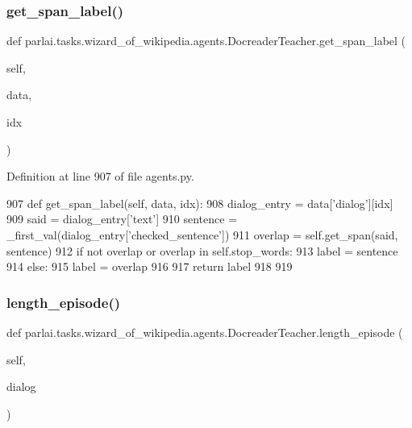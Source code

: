 \subsubsection{\texorpdfstring{get\+\_\+span\+\_\+label()}{get\_span\_label()}}
{\footnotesize\ttfamily def parlai.\+tasks.\+wizard\+\_\+of\+\_\+wikipedia.\+agents.\+Docreader\+Teacher.\+get\+\_\+span\+\_\+label (\begin{DoxyParamCaption}\item[{}]{self,  }\item[{}]{data,  }\item[{}]{idx }\end{DoxyParamCaption})}



Definition at line 907 of file agents.\+py.


\begin{DoxyCode}
907     \textcolor{keyword}{def }get\_span\_label(self, data, idx):
908         dialog\_entry = data[\textcolor{stringliteral}{'dialog'}][idx]
909         said = dialog\_entry[\textcolor{stringliteral}{'text'}]
910         sentence = \_first\_val(dialog\_entry[\textcolor{stringliteral}{'checked\_sentence'}])
911         overlap = self.get\_span(said, sentence)
912         \textcolor{keywordflow}{if} \textcolor{keywordflow}{not} overlap \textcolor{keywordflow}{or} overlap \textcolor{keywordflow}{in} self.stop\_words:
913             label = sentence
914         \textcolor{keywordflow}{else}:
915             label = overlap
916 
917         \textcolor{keywordflow}{return} label
918 
919 
\end{DoxyCode}
\mbox{\label{classparlai_1_1tasks_1_1wizard__of__wikipedia_1_1agents_1_1DocreaderTeacher_a1cb75f751dfa0b36d0f5c641c82be6c5}} 
\subsubsection{\texorpdfstring{length\+\_\+episode()}{length\_episode()}}
{\footnotesize\ttfamily def parlai.\+tasks.\+wizard\+\_\+of\+\_\+wikipedia.\+agents.\+Docreader\+Teacher.\+length\+\_\+episode (\begin{DoxyParamCaption}\item[{}]{self,  }\item[{}]{dialog }\end{DoxyParamCaption})}



